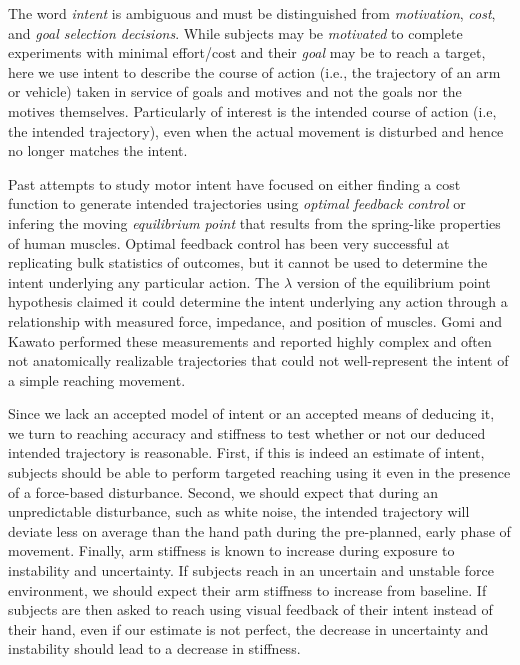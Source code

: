 \documentclass[letterpaper, 10 pt, conference]{ieeeconf}  %
\begin{document}
The word \textit{intent} is ambiguous and must be distinguished from \textit{motivation}\cite{mcclelland1985motives}\cite{rawolle2013relationships}, \textit{cost}\cite{todorov2002optimal}\cite{flash1985coordination}, and \textit{goal selection decisions}\cite{ziebart2010modeling}. While subjects may be \textit{motivated} to complete experiments with minimal effort/cost and their \textit{goal} may be to reach a target, here we use intent to describe the course of action (i.e., the trajectory of an arm or vehicle) taken in service of goals and motives and not the goals nor the motives themselves. Particularly of interest is the intended course of action (i.e, the intended trajectory), even when the actual movement is disturbed and hence no longer matches the intent.

Past attempts to study motor intent have focused on either finding a cost function to generate intended trajectories using \textit{optimal feedback control} or infering the moving \textit{equilibrium point} that results from the spring-like properties of human muscles. Optimal feedback control has been very successful at replicating bulk statistics of outcomes, but it cannot be used to determine the intent underlying any particular action\cite{todorov2002optimal}. The $\lambda$ version of the equilibrium point hypothesis claimed it could determine the intent underlying any action through a relationship with measured force, impedance, and position of muscles\cite{feldman1995origin}. Gomi and Kawato\cite{gomi1997human} performed these measurements and reported highly complex and often not anatomically realizable trajectories that could not well-represent the intent of a simple reaching movement.

Since we lack an accepted model of intent or an accepted means of deducing it, we turn to reaching accuracy and stiffness to test whether or not our deduced intended trajectory is reasonable. First, if this is indeed an estimate of intent, subjects should be able to perform targeted reaching using it even in the presence of a force-based disturbance. Second, we should expect that during an unpredictable disturbance, such as white noise, the intended trajectory will deviate less on average than the hand path during the pre-planned, early phase of movement. Finally, arm stiffness is known to increase during exposure to instability\cite{franklin2003adaptation} and uncertainty\cite{takahashi2001impedance}. If subjects reach in an uncertain and unstable force environment, we should expect their arm stiffness to increase from baseline. If subjects are then asked to reach using visual feedback of their intent instead of their hand, even if our estimate is not perfect, the decrease in uncertainty and instability should lead to a decrease in stiffness.
\end{document}

